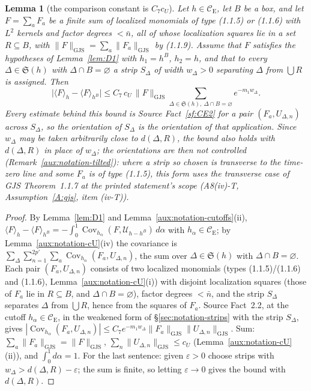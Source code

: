 \documentclass[11pt,a4paper]{article}
\theoremstyle{plain}
\theoremstyle{definition}
\theoremstyle{plain}
\newtheorem{auxlemma}{Lemma}
\theoremstyle{definition}
\newcommand{\CE}{\mathcal{C}_{\mathrm E}}
\DeclareMathOperator{\Cov}{Cov}
\newcommand{\GJS}[1]{\lVert #1\rVert_{\mathrm{GJS}}}   %
\newcommand{\ev}[2]{\langle #1\rangle_{#2}}            %
\newcommand{\Uc}{\mathcal U}
\begin{document}
\begin{auxlemma}[the comparison constant is $C_7c_U$]\label{aux:constants-comparison}
Let $h\in\CE$, let $B$ be a box, and let $F=\sum_{a}F_a$ be a finite sum of localized
monomials of type (1.1.5) or (1.1.6) with $L^2$ kernels and factor degrees $<\bar n$, all of
whose localization squares lie in a set $R\subseteq B$, with $\GJS F=\sum_a\GJS{F_a}$ by
(1.1.9).  Assume that $F$ satisfies the hypotheses of Lemma~\ref{lem:D1} with $h_1=h^B$,
$h_2=h$, and that to every $\Delta\in\mathfrak S(h)$ with $\Delta\cap B=\varnothing$ a strip
$S_\Delta$ of width $w_\Delta>0$ separating $\Delta$ from $\bigcup R$ is assigned.  Then
\[
 \bigl|\ev Fh-\ev F{h^B}\bigr|\le C_7\,c_U\,\GJS F\sum_{\Delta\in\mathfrak S(h),\ \Delta\cap
 B=\varnothing}e^{-m_1w_\Delta} .
\]
Every estimate behind this bound is Source Fact~\ref{sf:CE2} for a pair $(F_a,U_{\Delta,n})$ across
$S_\Delta$, so the orientation of $S_\Delta$ is the orientation of that application.  Since
$w_\Delta$ may be taken arbitrarily close to $d(\Delta,R)$, the bound also holds with
$d(\Delta,R)$ in place of $w_\Delta$; the orientations are then not controlled
(Remark~\ref{aux:notation-tilted}): where a strip so chosen is transverse to the time-zero line
and some $F_a$ is of type (1.1.5), this form uses the transverse case of GJS Theorem~1.1.7 at the
printed statement's scope (A8(iv)-T, Assumption~\ref{A:gjs}, item (iv-T)).
\end{auxlemma}

\begin{proof}
By Lemma~\ref{lem:D1} and Lemma~\ref{aux:notation-cutoffs}(ii),
$\ev Fh-\ev F{h^B}=-\int_0^1\Cov_{h_\alpha}(F,\Uc_{h-h^B})\,d\alpha$ with $h_\alpha\in\CE$; by
Lemma~\ref{aux:notation-cU}(iv) the covariance is
$\sum_{\Delta}\sum_{n=1}^{2p'}\sum_a\Cov_{h_\alpha}(F_a,U_{\Delta,n})$, the sum over
$\Delta\in\mathfrak S(h)$ with $\Delta\cap B=\varnothing$.  Each pair $(F_a,U_{\Delta,n})$
consists of two localized monomials (types (1.1.5)/(1.1.6) and (1.1.6),
Lemma~\ref{aux:notation-cU}(i)) with disjoint localization squares (those of $F_a$ lie in
$R\subseteq B$, and $\Delta\cap B=\varnothing$), factor degrees $<\bar n$, and the strip
$S_\Delta$ separates $\Delta$ from $\bigcup R$, hence from the squares of $F_a$.  Source
Fact~2.2, at the cutoff $h_\alpha\in\CE$, in the weakened form of \S\ref{sec:notation-strips}
with the strip $S_\Delta$, gives
$|\Cov_{h_\alpha}(F_a,U_{\Delta,n})|\le C_7e^{-m_1w_\Delta}\GJS{F_a}\GJS{U_{\Delta,n}}$.  Sum:
$\sum_a\GJS{F_a}=\GJS F$, $\sum_n\GJS{U_{\Delta,n}}\le c_U$ (Lemma~\ref{aux:notation-cU}(ii)),
and $\int_0^1d\alpha=1$.  For the last sentence: given $\varepsilon>0$ choose strips with
$w_\Delta>d(\Delta,R)-\varepsilon$; the sum is finite, so letting $\varepsilon\to0$ gives the
bound with $d(\Delta,R)$.
\end{proof}
\end{document}
